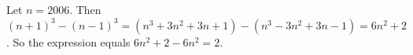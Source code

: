 Let $n=2006$. Then $(n+1)^3-(n-1)^3=\left(n^3+3n^2+3n+1\right)-\left(n^3-3n^2+3n-1\right)=6n^2+2$. So the expression equals $6n^2+2-6n^2=\boxed{2}$.
